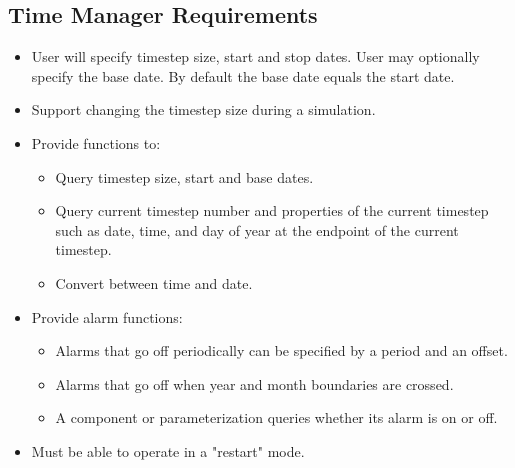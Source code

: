 \subsection{Time Manager Requirements}
\begin{itemize}

\item User will specify timestep size, start and stop dates. User may optionally specify the base date. 
By default the base date equals the start date.

\item Support changing the timestep size during a simulation. 

\item Provide functions to:

\begin{itemize}
\item Query timestep size, start and base dates.

\item Query current timestep number and properties of the current timestep such as date, 
time, and day of year at the endpoint of the current timestep.

\item Convert between time and date.
\end{itemize}

\item Provide alarm functions:

\begin{itemize}
\item Alarms that go off periodically can be specified by a period and an offset.

\item Alarms that go off when year and month boundaries are crossed.

\item A component or parameterization queries whether its alarm is on or off.
\end{itemize}

\item Must be able to operate in a "restart" mode.

\end{itemize}







